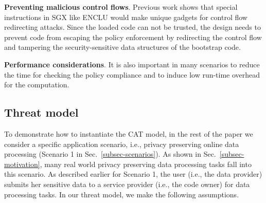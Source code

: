 {\vspace{3pt}\noindent\textbf{Preventing malicious control flows}.\label{challenge-cfi} 
    Previous work shows that special instructions in SGX like ENCLU would make unique gadgets for control flow redirecting attacks.
    Since the loaded code can not be trusted, the design needs to prevent code from escaping the policy enforcement by redirecting the control flow and tampering the security-sensitive data structures of the bootstrap code.

\vspace{3pt}\noindent\textbf{Performance considerations}.\label{challenge-perf} It is also important in many scenarios to reduce the time for checking the policy compliance and to induce low run-time overhead for the computation. 

\subsection{Threat model}
\label{subsec-threat}
To demonstrate how to instantiate the CAT model, in the rest of the paper we consider a specific application scenario, i.e., privacy preserving online data processing (Scenario 1 in Sec.~\ref{subsec-scenarios}). As shown in Sec.~\ref{subsec-motivation}, many real world privacy preserving data processing tasks fall into this scenario. 
As described earlier for Scenario 1, the user (i.e., the data provider) submits her sensitive data to a service provider (i.e., the code owner) for data processing tasks. In our threat model, we make the following assumptions.
 
}
